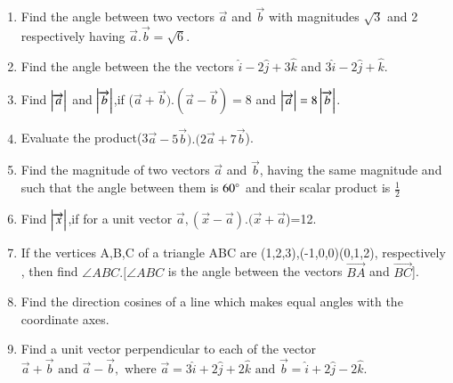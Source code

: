 \begin{enumerate}[label=\thesection.\arabic*,ref=\thesection.\theenumi]
\item Find the angle between two vectors $\overrightarrow{a}$ and $\overrightarrow {b} $ with magnitudes $\sqrt{3}$ and 2 respectively having $\overrightarrow {a}.\overrightarrow {b}=\sqrt{6}$.
	\\
	\solution
		
\item Find the angle between the the vectors $\hat{i}-2\hat{j}+3\hat{k}$ and $3\hat{i}-2\hat{j}+\hat{k}$.
	\\
	\solution
		
\item Find $\left\vert\overrightarrow {a}\right\vert$ and $\left\vert\overrightarrow {b}\right\vert$,if ($\overrightarrow {a}+\overrightarrow {b}).(\overrightarrow {a}-\overrightarrow {b})=8$ and $\left\vert\overrightarrow {a}\right\vert=8\left\vert\overrightarrow {b}\right\vert$.
	\\
	\solution
		
\item Evaluate the product(3$\overrightarrow {a}-5\overrightarrow {b}).(2\overrightarrow {a}+7\overrightarrow {b}$).
	\\
	\solution
		
\item Find the magnitude of two vectors $\overrightarrow {a}$ and $\overrightarrow {b}$, having the same magnitude and such that the angle between them is $60\degree$ and their scalar product is $\frac{1}{2}$
	\\
	\solution
		
\item Find $\left\vert\overrightarrow {x}\right\vert$,if for a unit vector $\overrightarrow {a},(\overrightarrow {x}-\overrightarrow {a}).(\overrightarrow {x}+\overrightarrow {a}$)=12.
	\\
		
\item If the vertices A,B,C of a triangle ABC are (1,2,3),(-1,0,0)(0,1,2), respectively , then find  $\angle{ABC}. [\angle{ABC}$ is the angle between the vectors $\overrightarrow{BA}$ and $\overrightarrow{BC}$].
	\\
	\solution
		
    \item Find the direction cosines of a line which makes equal angles with the coordinate
    axes.
		\\
		\solution
		
\item Find a unit vector perpendicular to each of the vector $\overrightarrow{a}+\overrightarrow{b}\text{ and }\overrightarrow{a}-\overrightarrow{b},\text{ where } \overrightarrow{a}=3\hat{i}+2\hat{j}+2\hat{k}\text{ and } \overrightarrow{b}=\hat{i}+2\hat{j}-2\hat{k}$. 

\end{enumerate}
